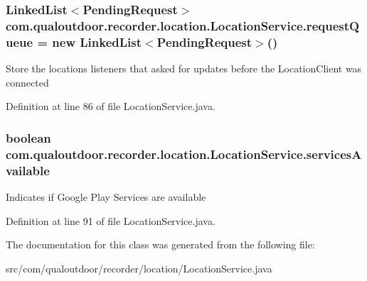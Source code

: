 \hypertarget{classcom_1_1qualoutdoor_1_1recorder_1_1location_1_1LocationService_a1be76c7931903a411c5973db4a5185fd}{
\subsubsection[{request\-Queue}]{\setlength{\rightskip}{0pt plus 5cm}Linked\-List$<${\bf Pending\-Request}$>$ com.\-qualoutdoor.\-recorder.\-location.\-Location\-Service.\-request\-Queue = new Linked\-List$<${\bf Pending\-Request}$>$()\hspace{0.3cm}{\ttfamily [private]}}}\label{classcom_1_1qualoutdoor_1_1recorder_1_1location_1_1LocationService_a1be76c7931903a411c5973db4a5185fd}
Store the locations listeners that asked for updates before the Location\-Client was connected 

Definition at line 86 of file Location\-Service.\-java.

\hypertarget{classcom_1_1qualoutdoor_1_1recorder_1_1location_1_1LocationService_af905331a32eb5230aadc45d89a751a13}{
\subsubsection[{services\-Available}]{\setlength{\rightskip}{0pt plus 5cm}boolean com.\-qualoutdoor.\-recorder.\-location.\-Location\-Service.\-services\-Available\hspace{0.3cm}{\ttfamily [private]}}}\label{classcom_1_1qualoutdoor_1_1recorder_1_1location_1_1LocationService_af905331a32eb5230aadc45d89a751a13}
Indicates if Google Play Services are available 

Definition at line 91 of file Location\-Service.\-java.



The documentation for this class was generated from the following file\-:\begin{DoxyCompactItemize}
\item 
src/com/qualoutdoor/recorder/location/Location\-Service.\-java\end{DoxyCompactItemize}
